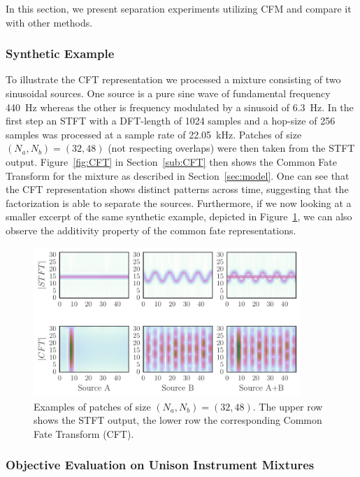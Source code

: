 In this section, we present separation experiments utilizing CFM and compare it with other methods.

\subsubsection{Synthetic Example}
\label{sub:Synthentic_Examples}

To illustrate the CFT representation we processed a mixture consisting of two sinusoidal sources. One source is a pure sine wave of fundamental frequency 440~Hz whereas the other is frequency modulated by a sinusoid of 6.3~Hz. In the first step an STFT with a DFT-length of 1024 samples and a hop-size of 256 samples was processed at a sample rate of 22.05~kHz. Patches of size $(N_a, N_b) = (32, 48)$ (not respecting overlaps) were then taken from the STFT output. Figure~\ref{fig:CFT} in Section~\ref{sub:CFT} then shows the Common Fate Transform for the mixture as described in Section~\ref{sec:model}. One can see that the CFT representation shows distinct patterns across time, suggesting that the factorization is able to separate the sources. 
Furthermore, if we now looking at a smaller excerpt of the same synthetic example, depicted in Figure~\ref{fig:gridplot}, we can also observe the additivity property of the common fate representations.

\begin{figure}[!h]
\centering
		\includegraphics[width=0.9\textwidth]{Chapters/06_Separation_Unknown/figures/gridplot.pdf}
\caption{Examples of patches of size $(N_a, N_b) = (32, 48)$. The upper row shows the STFT output, the lower row the corresponding Common Fate Transform (CFT).}
\label{fig:gridplot}
\end{figure}

\subsubsection{Objective Evaluation on Unison Instrument Mixtures}

